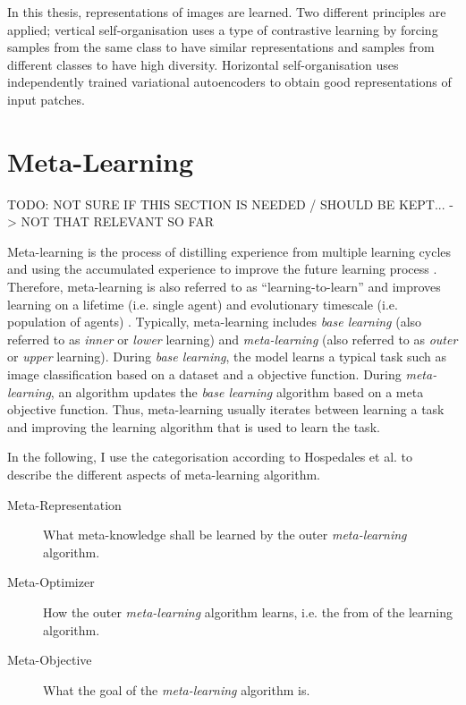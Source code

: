 In this thesis, representations of images are learned.
Two different principles are applied;
vertical self-organisation uses a type of contrastive learning by forcing samples from the same class to have similar representations and samples from different classes to have high diversity.
Horizontal self-organisation uses independently trained variational autoencoders to obtain good representations of input patches.


\section{Meta-Learning}
TODO: NOT SURE IF THIS SECTION IS NEEDED / SHOULD BE KEPT... -> NOT THAT RELEVANT SO FAR

Meta-learning is the process of distilling experience from multiple learning cycles and using the accumulated experience to improve the future learning process .
Therefore, meta-learning is also referred to as ``learning-to-learn''  and improves learning on a lifetime (i.e. single agent) and evolutionary timescale (i.e. population of agents) .
Typically, meta-learning includes \emph{base learning} (also referred to as \emph{inner} or \emph{lower} learning) and \emph{meta-learning} (also referred to as \emph{outer} or \emph{upper} learning).
During \emph{base learning}, the model learns a typical task such as image classification based on a dataset and a objective function.
During \emph{meta-learning}, an algorithm updates the \emph{base learning} algorithm based on a meta objective function.
Thus, meta-learning usually iterates between learning a task and improving the learning algorithm that is used to learn the task.

In the following, I use the categorisation according to Hospedales et al. \cite{Hospedales_Antoniou_Micaelli_Storkey_2021} to describe the different aspects of meta-learning algorithm.
\begin{description}
   \item[Meta-Representation] What meta-knowledge shall be learned by the outer \emph{meta-learning} algorithm.
   \item[Meta-Optimizer] How the outer \emph{meta-learning} algorithm learns, i.e. the from of the learning algorithm.
   \item[Meta-Objective] What the goal of the \emph{meta-learning} algorithm is.
\end{description}

